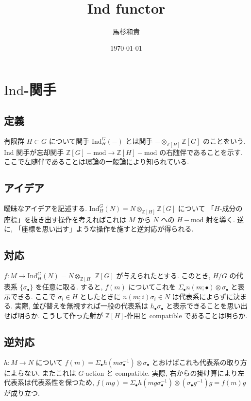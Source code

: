 \documentclass{jsarticle}
\title{Ind functor}
\author{馬杉和貴}
\date{\today}
\theoremstyle{break}
\newcommand{\ind}[3]{%
  \mathrm{Ind}^{#1}_{#2}({#3})
}
\begin{document}
\maketitle

\section{$\mathrm{Ind}$-関手}
\subsection{定義}
有限群 $H \subset G$ について関手 $\ind{G}{H}{-}$ とは関手 $-\otimes_{\mathbb{Z}[H]}\mathbb{Z}[G]$ のことをいう. $\mathrm{Ind}$ 関手が忘却関手 $\mathbb{Z}[G]-\mathrm{mod} \to \mathbb{Z}[H]-\mathrm{mod}$ の右随伴であることを示す. ここで左随伴であることは環論の一般論により知られている.

\subsection{アイデア}
曖昧なアイデアを記述する. $\ind{G}{H}{N} = N \otimes_{\mathbb{Z}[H]} \mathbb{Z}[G]$ について 「$H$-成分の座標」を抜き出す操作を考えればこれは $M$ から $N$ への $H-\mathrm{mod}$ 射を導く. 逆に, 「座標を思い出す」ような操作を施すと逆対応が得られる.

\subsection{対応}
$f \colon M \to \ind{G}{H}{N} = N \otimes_{\mathbb{Z}[H]} \mathbb{Z}[G]$ が与えられたとする. このとき, $H/G$ の代表系 $\{\sigma_\bullet\}$ を任意に取る. すると, $f(m)$ についてこれを $\Sigma_\bullet n(m; \bullet) \otimes \sigma_\bullet$ と表示できる. ここで $\sigma_i \in H$ としたときに $n(m; i) \sigma_i \in N$ は代表系によらずに決まる. 実際, 並び替えを無視すれば一般の代表系は $h_\bullet\sigma_\bullet$ と表示できることを思い出せば明らか. こうして作った射が $\mathbb{Z}[H]$-作用と compatible であることは明らか.

\subsection{逆対応}
$h\colon M\to N$ について $f(m) = \Sigma_\bullet h(m\sigma_\bullet^{-1}) \otimes \sigma_\bullet$ とおけばこれも代表系の取り方によらない. またこれは $G$-action と compatible. 実際, 右からの掛け算により左代表系は代表系性を保つため, $f(mg) = \Sigma_\bullet h(mg\sigma_\bullet^{-1}) \otimes (\sigma_\bullet g^{-1})g = f(m)g$ が成り立つ.
\end{document}
